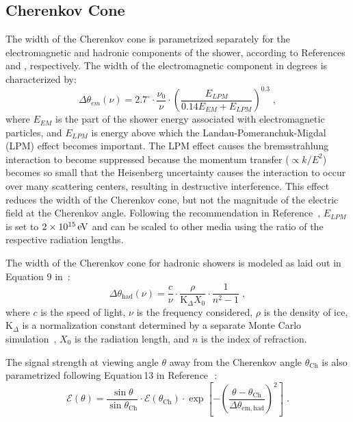
\subsection{Cherenkov Cone}
\label{subsec:cherenkov_width}
The width of the Cherenkov cone is parametrized separately for the electromagnetic and hadronic components of the shower, according to References \cite{JaimeAskarian2000} and \cite{jaime05}, respectively.
The width of the electromagnetic
component in degrees is characterized by:
\begin{equation}
\label{eq:deltheta_em}
\Delta\theta_{em}(\nu)=2.7^{\circ} \cdot \frac{\nu_0}{\nu}\cdot \left(
  \frac{E_{LPM}}{ 0.14 E_{EM}+E_{LPM}} \right)^{0.3} \;,
\end{equation}
where 
$E_{EM}$ is the part of the shower energy associated with electromagnetic particles, and 
$E_{LPM}$ is energy above which the Landau-Pomeranchuk-Migdal
(LPM) effect becomes important.  
The LPM effect causes
the bremsstrahlung interaction to become suppressed because
the momentum transfer ($\propto k/E^2$) becomes so small 
that the Heisenberg uncertainty
causes the interaction to occur over many
scattering centers, resulting in destructive interference.  
This effect reduces the width of the Cherenkov cone, but not the magnitude of the electric field at the Cherenkov angle.
Following the recommendation in Reference~\cite{JaimeAskarian2000}, 
$E_{LPM}$ is set to $2\times10^{15}\mathrm{\,e\kern -0.1em V}$
and can be scaled to other media using the ratio of the respective radiation lengths.


The width of the Cherenkov cone for hadronic showers is modeled as laid out in Equation 9
in~\cite{jaime05}:
\begin{equation}
\Delta \theta_{\mathrm{had}} (\nu) =\frac{c}{\nu} \cdot
	\frac{\rho}{\mathrm{K}_{\Delta} X_0} \cdot
	\frac{1}{n^2-1} \;,
\end{equation}
\noindent where
$c$ is the speed of light,
$\nu$ is the frequency considered, 
$\rho$ is the density of ice,
$\mathrm{K}_{\Delta}$ is a normalization constant determined by a
separate Monte Carlo simulation~\cite{jaime05},
$X_0$ is the radiation length, and
$n$ is the index of refraction.

The signal strength at viewing angle $\theta$ 
away from the Cherenkov angle $\theta_{\mathrm{Ch}}$ is also parametrized following
Equation\,13 in Reference\,~\cite{jaime05}:
\begin{equation}
\mathcal{E}(\theta)=\frac{\sin{\theta}}{\sin{\theta_{\mathrm{Ch}}}} \cdot
\mathcal{E}(\theta_{\mathrm{Ch}})\cdot \exp\left[-\left(
    \frac{\theta-\theta_{\mathrm{Ch}}}{\Delta\theta_{\mathrm{em,had}}} \right)^2
\right] \;.
\end{equation}




